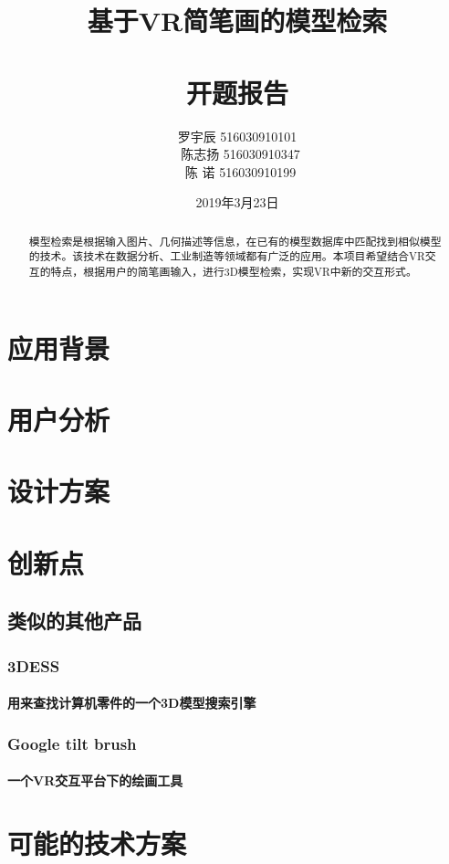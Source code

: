\documentclass{article}
\title{基于VR简笔画的模型检索\\\ \\ 开题报告}
\author{
罗宇辰 516030910101  \\\
陈志扬 516030910347  \\\
陈  诺 516030910199 
}
\date{2019年3月23日}
\begin{document}
\maketitle
\tableofcontents

\clearpage

\begin{abstract}
模型检索是根据输入图片、几何描述等信息，在已有的模型数据库中匹配找到相似模型的技术。该技术在数据分析、工业制造等领域都有广泛的应用。本项目希望结合VR交互的特点，根据用户的简笔画输入，进行3D模型检索，实现VR中新的交互形式。
\end{abstract}

\section{应用背景}

\section{用户分析}

\section{设计方案}

\section{创新点}
\subsection{类似的其他产品}
\subsubsection{3DESS}
\paragraph{
用来查找计算机零件的一个3D模型搜索引擎
}
\subsubsection{Google tilt brush}
\paragraph{
一个VR交互平台下的绘画工具
}

\section{可能的技术方案}
\end{document}
